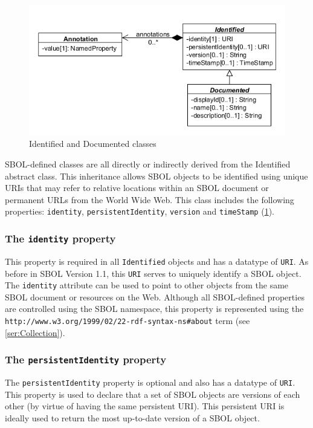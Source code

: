 \documentclass[draftspec]{sbmlpkgspec}
\begin{document}
\begin{figure}[h]
\begin{center}
\includegraphics[width=\textwidth]{uml/identified_documented_annotation}
\caption[]{Identified and Documented classes}
\label{uml:identified_documented_annotation}
\end{center}
\end{figure}

SBOL-defined classes are all directly or indirectly derived from the Identified abstract class. This inheritance allows SBOL objects to be identified using unique URIs that may refer to relative locations within an SBOL document or permanent URLs from the World Wide Web. This class includes the following properties: \verb|identity|, \verb|persistentIdentity|, \verb|version| and \verb|timeStamp| (\ref{uml:identified_documented_annotation}).

\subsubsection{The \texttt{identity} property}
This property is required in all \texttt{Identified} objects and has a datatype of \texttt{URI}. As before in SBOL Version 1.1, this \texttt{URI} serves to uniquely identify a SBOL object. The \texttt{identity} attribute can be used to point to other objects from the same SBOL document or resources on the Web. Although all SBOL-defined properties are controlled using the SBOL namespace, this property is represented using the \texttt{http://www.w3.org/1999/02/22-rdf-syntax-ns\#about} term (see \ref{ser:Collection}).

\subsubsection{The \texttt{persistentIdentity} property}
The \texttt{persistentIdentity} property is optional and also has a datatype of \texttt{URI}. This property is used to declare that a set of SBOL objects are versions of each other (by virtue of having the same persistent URI). This persistent URI is ideally used to return the most up-to-date version of a SBOL object.
\end{document}
